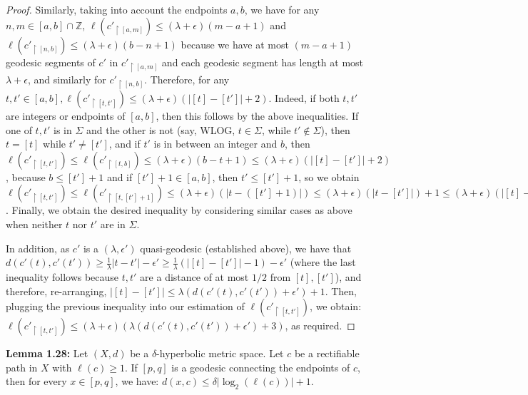 \documentclass[12pt]{article}
\newcommand{\vs}{\vskip10pt}
\begin{document}
\begin{proof}
		Similarly, taking into account the endpoints $a,b$, we have for any $n,m \in [a,b] \cap \mathbb{Z}$, $\ell(c'_{\restriction [a,m]}) \leq (\lambda + \epsilon)(m-a+1)$ and $\ell(c'_{\restriction [n,b]}) \leq (\lambda + \epsilon)(b- n +1)$ because we have at most $(m - a + 1)$ geodesic segments of $c'$ in $c'_{\restriction [a,m]}$ and each geodesic segment has length at most $\lambda + \epsilon$, and similarly for $c'_{\restriction [n,b]}$. Therefore, for any $t, t' \in [a,b], \ell(c'_{\restriction [t, t']}) \leq (\lambda + \epsilon)(\vert [t] - [t'] \vert + 2)$. Indeed, if both $t,t'$ are integers or endpoints of $[a,b]$, then this follows by the above inequalities. If one of $t,t'$ is in $\Sigma$ and the other is not (say, WLOG, $t \in \Sigma$, while $t' \notin \Sigma$), then $t = [t]$ while $t' \neq [t']$, and if $t'$ is in between an integer and $b$, then $\ell(c'_{\restriction [t, t']}) \leq \ell(c'_{\restriction [t, b]}) \leq (\lambda + \epsilon)(b - t + 1) \leq  (\lambda + \epsilon)(\vert [t] - [t'] \vert + 2)$, because $b \leq [t'] + 1$ and if $[t'] + 1 \in [a,b]$, then $t' \leq [t'] + 1$, so we obtain $\ell(c'_{\restriction [t, t']}) \leq \ell(c'_{\restriction [t, [t']+1]}) \leq (\lambda + \epsilon)(\vert t - ([t'] + 1) \vert) \leq (\lambda + \epsilon)(\vert t - [t'] \vert) + 1 \leq (\lambda + \epsilon)(\vert [t] - [t'] \vert + 2)$. Finally, we obtain the desired inequality by considering similar cases as above when neither $t$ nor $t'$ are in $\Sigma$. 
		
		\vs 
		
	In addition, as $c'$ is a $(\lambda, \epsilon')$ quasi-geodesic (established above), we have that $d(c'(t), c'(t')) \geq \frac{1}{\lambda} \vert t - t' \vert - \epsilon' \geq \frac{1}{\lambda} (\vert [t] - [t'] \vert -1) - \epsilon'$ (where the last inequality follows because $t,t'$ are a distance of at most $1/2$ from $[t], [t']$), and therefore, re-arranging, $\vert [t] - [t'] \vert \leq \lambda(d(c'(t), c'(t')) + \epsilon') + 1$. Then, plugging the previous inequality into our estimation of $\ell(c'_{\restriction [t, t']})$, we obtain: $\ell(c'_{\restriction [t, t']}) \leq (\lambda + \epsilon)(\lambda(d(c'(t), c'(t')) + \epsilon') + 3)$, as required. 
		
	\end{proof}
	
	\vs 
	
	\textbf{Lemma 1.28: } Let $(X,d)$ be a $\delta$-hyperbolic metric space. Let $c$ be a rectifiable path in $X$ with $\ell(c) \geq 1$. If $[p,q]$ is a geodesic connecting the endpoints of $c$, then for every $x \in [p,q]$, we have: $d(x,c) \leq \delta \vert \log_2( \ell(c)) \vert + 1$. 
	
\end{document}
